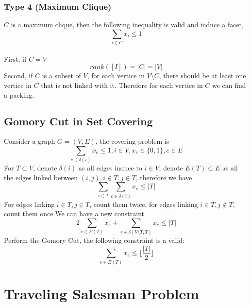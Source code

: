 			\subsection{Type 4 (Maximum Clique)}
				$C$ is a maximum clique, then the following inequality is valid and induce a facet,
				\begin{equation}
					\sum_{i\in C} x_i \le 1 
				\end{equation}
				\\
					First, if $C=V$
					\begin{equation}
						rank\left(\left[I\right]\right) = |C| = |V| 
					\end{equation}
					Second, if $C$ is a subset of $V$, for each vertice in $V \setminus C$, there should be at least one vertice in $C$ that is not linked with it. Therefore for each vertice in $C$ we can find a packing.

		\section{Gomory Cut in Set Covering}
			Consider a graph $G=(V, E)$, the covering problem is
			\begin{equation}
				\sum_{e\in \delta(i)}x_e \le 1, i\in V, x_e\in \{0, 1\}, e\in E
			\end{equation}
			For $T\subset V$, denote $\delta(i)$ as all edges induce to $i\in V$, denote $E(T) \subset E$ as all the edges linked between $(i, j), i\in T, j\in T$, therefore we have
			\begin{equation}
				\sum_{i\in T}\sum_{e\in \delta(i)}x_e \le |T| 
			\end{equation}
			For edges linking $i \in T, j \in T$, count them twice, for edges linking $i\in T, j\notin T$, count them once.We can have a new constraint
			\begin{equation}
				2\sum_{e\in E(T)}x_e + \sum_{e\in \delta(V\setminus T, T)}x_e \le |T| 
			\end{equation}
			Perform the Gomory Cut, the following constraint is a valid:
			\begin{equation}
				\sum_{e\in E(T)}x_e \le \lfloor \frac{|T|}2 \rfloor 
			\end{equation}

	\chapter{Traveling Salesman Problem}
